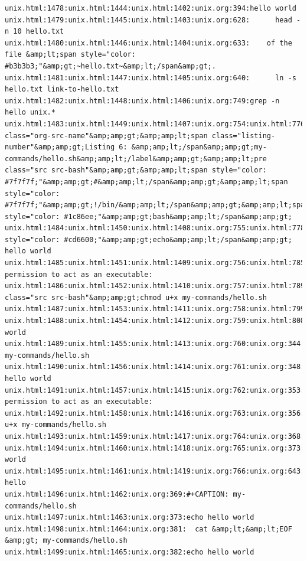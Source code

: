 \documentclass[11pt]{article}
\begin{document}
\begin{verbatim}
unix.html:1478:unix.html:1444:unix.html:1402:unix.org:394:hello world
unix.html:1479:unix.html:1445:unix.html:1403:unix.org:628:      head -n 10 hello.txt
unix.html:1480:unix.html:1446:unix.html:1404:unix.org:633:    of the file &amp;lt;span style="color: #b3b3b3;"&amp;gt;~hello.txt~&amp;lt;/span&amp;gt;.
unix.html:1481:unix.html:1447:unix.html:1405:unix.org:640:      ln -s hello.txt link-to-hello.txt
unix.html:1482:unix.html:1448:unix.html:1406:unix.org:749:grep -n hello unix.*
unix.html:1483:unix.html:1449:unix.html:1407:unix.org:754:unix.html:776:&amp;amp;lt;label class="org-src-name"&amp;amp;gt;&amp;amp;lt;span class="listing-number"&amp;amp;gt;Listing 6: &amp;amp;lt;/span&amp;amp;gt;my-commands/hello.sh&amp;amp;lt;/label&amp;amp;gt;&amp;amp;lt;pre class="src src-bash"&amp;amp;gt;&amp;amp;lt;span style="color: #7f7f7f;"&amp;amp;gt;#&amp;amp;lt;/span&amp;amp;gt;&amp;amp;lt;span style="color: #7f7f7f;"&amp;amp;gt;!/bin/&amp;amp;lt;/span&amp;amp;gt;&amp;amp;lt;span style="color: #1c86ee;"&amp;amp;gt;bash&amp;amp;lt;/span&amp;amp;gt;
unix.html:1484:unix.html:1450:unix.html:1408:unix.org:755:unix.html:778:&amp;amp;lt;span style="color: #cd6600;"&amp;amp;gt;echo&amp;amp;lt;/span&amp;amp;gt; hello world
unix.html:1485:unix.html:1451:unix.html:1409:unix.org:756:unix.html:785:"hello.sh" permission to act as an executable:
unix.html:1486:unix.html:1452:unix.html:1410:unix.org:757:unix.html:789:&amp;amp;lt;pre class="src src-bash"&amp;amp;gt;chmod u+x my-commands/hello.sh
unix.html:1487:unix.html:1453:unix.html:1411:unix.org:758:unix.html:799:hello.sh
unix.html:1488:unix.html:1454:unix.html:1412:unix.org:759:unix.html:808:hello world
unix.html:1489:unix.html:1455:unix.html:1413:unix.org:760:unix.org:344:#+CAPTION: my-commands/hello.sh
unix.html:1490:unix.html:1456:unix.html:1414:unix.org:761:unix.org:348:echo hello world
unix.html:1491:unix.html:1457:unix.html:1415:unix.org:762:unix.org:353:"hello.sh" permission to act as an executable:
unix.html:1492:unix.html:1458:unix.html:1416:unix.org:763:unix.org:356:chmod u+x my-commands/hello.sh
unix.html:1493:unix.html:1459:unix.html:1417:unix.org:764:unix.org:368:hello.sh
unix.html:1494:unix.html:1460:unix.html:1418:unix.org:765:unix.org:373:hello world
unix.html:1495:unix.html:1461:unix.html:1419:unix.org:766:unix.org:643:grep hello 
unix.html:1496:unix.html:1462:unix.org:369:#+CAPTION: my-commands/hello.sh
unix.html:1497:unix.html:1463:unix.org:373:echo hello world
unix.html:1498:unix.html:1464:unix.org:381:  cat &amp;lt;&amp;lt;EOF &amp;gt; my-commands/hello.sh
unix.html:1499:unix.html:1465:unix.org:382:echo hello world

\end{verbatim}
\end{document}
